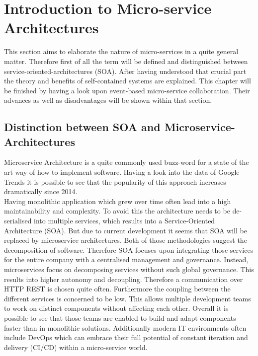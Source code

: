 \section{Introduction to Micro-service Architectures}
\label{sec:techKnowHow}
This section aims to elaborate the nature of micro-services in a quite general matter. Therefore first of all the term will be defined and distinguished between service-oriented-architectures (SOA). After having understood that crucial part the theory and benefits of self-contained systems are explained. This chapter will be finished by having a look upon event-based micro-service collaboration. Their advances as well as disadvantages will be shown within that section. 

\subsection{Distinction between SOA and Microservice-Architectures}
Microservice Architecture is a quite commonly used buzz-word for a state of the art way of how to implement software. Having a look into the data of Google Trends it is possible to see that the popularity of this approach increases dramatically since 2014. \cite{microservices}\newline
\\
Having monolithic application which grew over time often lead into a high maintainability and complexity. To avoid this the architecture needs to be de-serialised into multiple services, which results into a Service-Oriented Architecture (SOA). But due to current development it seems that SOA will be replaced by microservice architectures.\cite{mircorVSsoa}\newline
Both of those methodologies suggest the decomposition of software. Therefore SOA focuses upon integrating those services for the entire company with a centralised management and governance. Instead, microservices focus on decomposing services without such global governance. This results into higher autonomy and decoupling.\cite{mircorVSsoa} Therefore a communication over HTTP REST is chosen quite often.\newline
Furthermore the coupling between the different services is concerned to be low. This allows multiple development teams to work on distinct components without affecting each other. Overall it is possible to see that those teams are enabled to build and adapt components faster than in monolithic solutions. Additionally  modern IT environments often include DevOps which can embrace their full potential of constant iteration and delivery (CI/CD) within a micro-service world. \cite{redHatMicroservices}\newline
